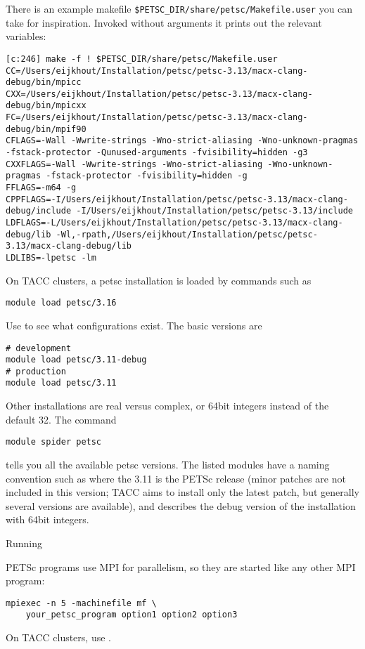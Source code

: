 There is an example makefile \verb+$PETSC_DIR/share/petsc/Makefile.user+
you can take for inspiration. Invoked without arguments it prints out
the relevant variables:
\begin{verbatim}
[c:246] make -f ! $PETSC_DIR/share/petsc/Makefile.user
CC=/Users/eijkhout/Installation/petsc/petsc-3.13/macx-clang-debug/bin/mpicc
CXX=/Users/eijkhout/Installation/petsc/petsc-3.13/macx-clang-debug/bin/mpicxx
FC=/Users/eijkhout/Installation/petsc/petsc-3.13/macx-clang-debug/bin/mpif90
CFLAGS=-Wall -Wwrite-strings -Wno-strict-aliasing -Wno-unknown-pragmas -fstack-protector -Qunused-arguments -fvisibility=hidden -g3
CXXFLAGS=-Wall -Wwrite-strings -Wno-strict-aliasing -Wno-unknown-pragmas -fstack-protector -fvisibility=hidden -g
FFLAGS=-m64 -g
CPPFLAGS=-I/Users/eijkhout/Installation/petsc/petsc-3.13/macx-clang-debug/include -I/Users/eijkhout/Installation/petsc/petsc-3.13/include
LDFLAGS=-L/Users/eijkhout/Installation/petsc/petsc-3.13/macx-clang-debug/lib -Wl,-rpath,/Users/eijkhout/Installation/petsc/petsc-3.13/macx-clang-debug/lib
LDLIBS=-lpetsc -lm
\end{verbatim}

\begin{taccnote}
  On TACC clusters, a petsc installation is loaded by commands such as
\begin{verbatim}
module load petsc/3.16
\end{verbatim}
Use  to see what configurations exist. The basic
versions are
\begin{verbatim}
# development
module load petsc/3.11-debug
# production
module load petsc/3.11
\end{verbatim}
Other installations are real versus complex, or 64bit integers instead
of the default 32. The command 
\begin{verbatim}
module spider petsc
\end{verbatim}
tells you all the
available petsc versions. The listed modules have a naming convention
such as  where the 3.11 is the PETSc release (minor
patches are not included in this version; TACC aims to install only
the latest patch, but generally several versions are available), and
 describes the debug version of the installation with 64bit
integers.
\end{taccnote}

 {Running}

PETSc programs use MPI for parallelism, so they are started like any other
MPI program:
\begin{verbatim}
mpiexec -n 5 -machinefile mf \
    your_petsc_program option1 option2 option3
\end{verbatim}
\begin{taccnote}
  On TACC clusters, use .
\end{taccnote}

